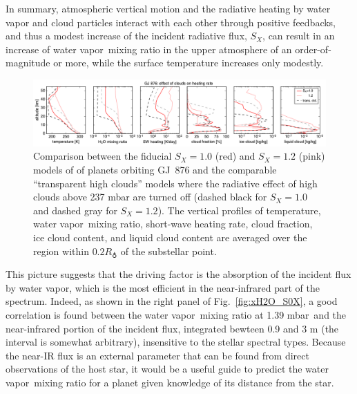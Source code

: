 \documentclass[11pt,numberedappendix,twocolappendix,]{emulateapj}
\def\water{H$_2$O }
\def\preslevel{1.39 mbar\ }
\newcommand{\yf}[1]{{\color{orange}#1}}
\newcommand{\wv}{water vapor\ }
\begin{document}
In summary, atmospheric vertical motion and the radiative heating by water vapor and cloud particles interact with each other through positive feedbacks, and thus a modest increase of the incident radiative flux, $S_X$, can result in  an increase of \wv mixing ratio in the upper atmosphere of an order-of-magnitude \yf{or more}, while the surface temperature increases only modestly. 


\begin{figure}[htb]
    \begin{center}
    \includegraphics[width=1\hsize]{fig/GJ876_heat_cld.pdf}
    \end{center}
\caption{Comparison between the fiducial $S_X=1.0$ (red) and $S_X=1.2$ (pink) models of of planets orbiting GJ~876 and the comparable ``transparent high clouds'' models where the radiative effect of high clouds above 237 mbar are turned off (dashed black for $S_X=1.0$ and dashed gray for $S_X=1.2$). The vertical profiles of temperature, \wv mixing ratio, short-wave heating rate, cloud fraction, ice cloud content, and liquid cloud content are averaged over the region within $0.2R_\earth$ of the substellar point. }
\label{fig:GJ876_heat_cld}
\end{figure}

This picture suggests that the driving factor is the absorption of the incident flux by water vapor, which is the most efficient in the near-infrared part of the spectrum. 
Indeed, as shown in the right panel of Fig.~\ref{fig:xH2O_S0X}, a good correlation is found between the \wv mixing ratio at \preslevel and the near-infrared portion of the incident flux, integrated bewteen 0.9 and 3 \textmu m (the interval is somewhat arbitrary), insensitive to the stellar spectral types. 
Because the near-IR flux is an external parameter that can be found from direct observations of the host star, it would be a useful guide to predict the \wv  mixing ratio for a planet \yf{given knowledge of its distance from the star}. 
\end{document}

